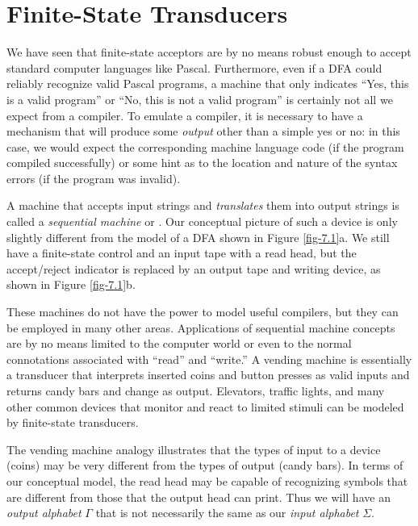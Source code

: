 \chapter{Finite-State Transducers}\label{ch-7}

We have seen that finite-state acceptors are by no means robust enough to accept
standard computer languages like Pascal. Furthermore, even if a DFA could
reliably recognize valid Pascal programs, a machine that only indicates ``Yes,
this is a valid program'' or ``No, this is not a valid program'' is certainly
not all we expect from a compiler. To emulate a compiler, it is necessary to
have a mechanism that will produce some \emph{output} other than a simple yes or
no: in this case, we would expect the corresponding machine language code (if
the program compiled successfully) or some hint as to the location and nature of
the syntax errors (if the program was invalid).

A machine that accepts input strings and \emph{translates} them into output
strings is called a \emph{sequential machine} or
\emph{}. Our conceptual picture of such a device is only
slightly different from the model of a DFA shown in Figure \ref{fig-7.1}a. We still have
a finite-state control and an input tape with a read head, but the accept/reject
indicator is replaced by an output tape and writing device, as shown in Figure
\ref{fig-7.1}b.

These machines do not have the power to model useful compilers, but they can
be employed in many other areas. Applications of sequential machine concepts
are by no means limited to the computer world or even to the normal connotations
associated with ``read'' and ``write.'' A vending machine is essentially a
transducer that interprets inserted coins and button presses as valid inputs and
returns candy bars and change as output. Elevators, traffic lights, and many
other common devices that monitor and react to limited stimuli can be modeled by
finite-state transducers.

The vending machine analogy illustrates that the types of input to a device
(coins) may be very different from the types of output (candy bars). In terms
of our conceptual model, the read head may be capable of recognizing symbols
that are different from those that the output head can print. Thus we will have
an \emph{output alphabet} $\Gamma$ that is not necessarily the same as
our \emph{input alphabet} $\Sigma$.

